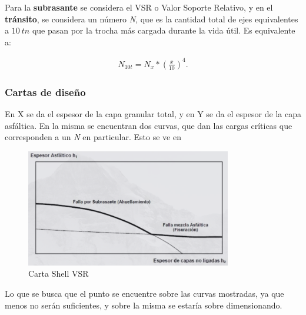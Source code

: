 \documentclass[../main.tex]{subfiles}
\begin{document}
Para la \textbf{subrasante} se considera el VSR o Valor Soporte Relativo, y en
el \textbf{tránsito}, se considera un número \textit{N}, que es la cantidad total
de ejes equivalentes a $\SI{10}{tn}$ que pasan por la trocha más cargada durante
la vida útil. Es equivalente a:

\begin{align*}
  N_{10t} = N_x*\left(  \frac{x}{10}\right)^4
.\end{align*}

\subsubsection{Cartas de diseño}

En X se da el espesor de la capa granular total, y en Y se da el espesor de la 
capa asfáltica. En la misma se encuentran dos curvas, que dan las cargas 
críticas que corresponden a un \textit{N} en particular. Esto se ve en 

\begin{figure}[htpb]
  \centering
  \includegraphics[width=0.8\textwidth]{../images/20210527/carta_shell}
  \caption{Carta Shell VSR}
  \label{fig:carta_shell}
\end{figure}  

Lo que se busca que el punto se encuentre sobre las curvas mostradas, ya que
menos no serán suficientes, y sobre la misma se estaría sobre dimensionando.
\end{document}
